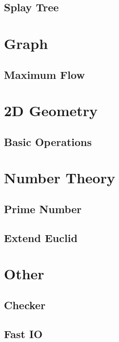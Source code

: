 \documentclass[twoside]{article}
\begin{document}
		\subsection{Splay Tree}
			
	\newpage
	\section{Graph}
		\subsection{Maximum Flow}
			
	\newpage
	\section{2D Geometry}
		\subsection{Basic Operations}
			
	\newpage
	\section{Number Theory}
		\subsection{Prime Number}
			
		\subsection{Extend Euclid}
			
	\newpage
	\section{Other}
		\subsection{Checker}
			
		\subsection{Fast IO}
			
\end{document}
